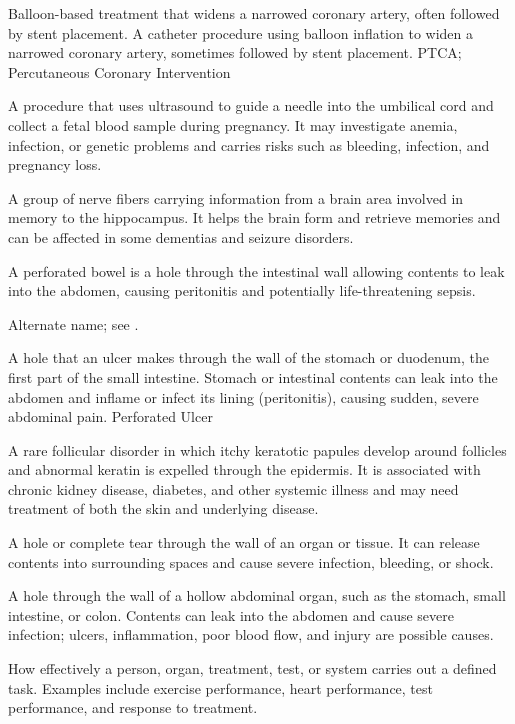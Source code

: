  Balloon-based treatment that widens a narrowed coronary artery, often followed by stent placement. A catheter procedure using balloon inflation to widen a narrowed coronary artery, sometimes followed by stent placement.
\synonyms
PTCA; Percutaneous Coronary Intervention

 A procedure that uses ultrasound to guide a needle into the umbilical cord and collect a fetal blood sample during pregnancy. It may investigate anemia, infection, or genetic problems and carries risks such as bleeding, infection, and pregnancy loss.

 A group of nerve fibers carrying information from a brain area involved in memory to the hippocampus. It helps the brain form and retrieve memories and can be affected in some dementias and seizure disorders.

 A perforated bowel is a hole through the intestinal wall allowing contents to leak into the abdomen, causing peritonitis and potentially life-threatening sepsis.

 Alternate name; see .

 A hole that an ulcer makes through the wall of the stomach or duodenum, the first part of the small intestine. Stomach or intestinal contents can leak into the abdomen and inflame or infect its lining (peritonitis), causing sudden, severe abdominal pain.
\synonyms
Perforated Ulcer

 A rare follicular disorder in which itchy keratotic papules develop around follicles and abnormal keratin is expelled through the epidermis. It is associated with chronic kidney disease, diabetes, and other systemic illness and may need treatment of both the skin and underlying disease.

 A hole or complete tear through the wall of an organ or tissue. It can release contents into surrounding spaces and cause severe infection, bleeding, or shock.

 A hole through the wall of a hollow abdominal organ, such as the stomach, small intestine, or colon. Contents can leak into the abdomen and cause severe infection; ulcers, inflammation, poor blood flow, and injury are possible causes.

 How effectively a person, organ, treatment, test, or system carries out a defined task. Examples include exercise performance, heart performance, test performance, and response to treatment.

